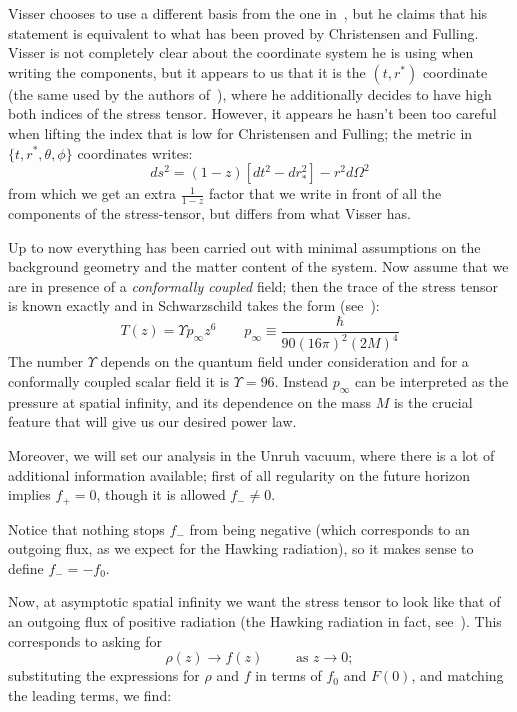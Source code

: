 \begin{remark}
    Visser chooses to use a different basis from the one  in~\cite[]{christensen1977trace}, but he claims that his statement is equivalent to what has been proved by Christensen and Fulling. Visser is not completely clear about the coordinate system he is using when writing the components, but it appears to us that it is the \((t, r^*)\) coordinate (the same used by the authors of~\cite[]{christensen1977trace}), where he additionally decides to have high both indices of the stress tensor. However, it appears he hasn't been too careful when lifting the index that is low for Christensen and Fulling; the metric in \(\{t, r^*, \theta, \phi\}\) coordinates writes:
    \[
    ds^2 = (1 - z) \left[dt^2 - dr_*^2\right]  -r^2d\Omega^2  
    \]
    from which we get an extra \(\frac{1}{1-z}\) factor that we write in front of all the components of the stress-tensor, but differs from what Visser has.
\end{remark}

Up to now everything has been carried out with minimal assumptions on the background geometry and the matter content of the system. Now assume that we are in presence of a \emph{conformally coupled} field; then the trace of the stress tensor is known exactly and in Schwarzschild takes the form (see~\cite{birrell1984quantum}):
\[
T(z) = \Upsilon p_{\infty}z^6 \quad \quad p_{\infty} \equiv \frac{\hbar}{90(16\pi)^2(2M)^4}   
\]
The number \(\Upsilon\) depends on the quantum field under consideration and for a conformally coupled scalar field it is \(\Upsilon = 96\). Instead \(p_{\infty}\) can be interpreted as the pressure at spatial infinity, and its dependence on the mass \(M\) is the crucial feature that will give us our desired power law.

Moreover, we will set our analysis in the Unruh vacuum, where there is a lot of additional information available; first of all regularity on the future horizon implies \(f_+ = 0\), though it is allowed \(f_- \neq 0\).

Notice that nothing stops \(f_-\) from being negative (which corresponds to an outgoing flux, as we expect for the Hawking radiation), so it makes sense to define \(f_- = -f_0\). 

Now, at asymptotic spatial infinity we want the stress tensor to look like that of an outgoing flux of positive radiation (the Hawking radiation in fact, see~\cite[]{christensen1977trace}). This corresponds to asking for
\[
\rho(z) \rightarrow f(z) \quad\quad \text{ as } z \rightarrow 0;    
\]
substituting the expressions for \(\rho\) and \(f\) in terms of \(f_0\) and \(F(0)\), and matching the leading terms, we find:

